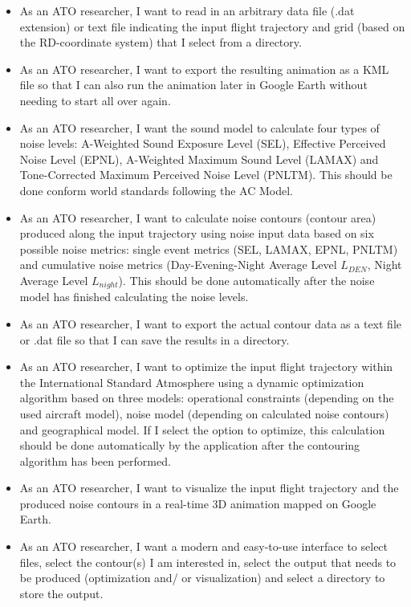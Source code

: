 \begin{itemize}
\item As an ATO researcher, I want to read in an arbitrary data file (.dat extension) or text file indicating the input flight trajectory and grid (based on the RD-coordinate system) that I select from a directory.
\item As an ATO researcher, I want to export the resulting animation as a KML file so that I can also run the animation later in Google Earth without needing to start all over again. 
\item As an ATO researcher, I want the sound model to calculate four types of noise levels: A-Weighted Sound Exposure Level (SEL), Effective Perceived Noise Level (EPNL), A-Weighted Maximum Sound Level (LAMAX) and Tone-Corrected Maximum Perceived Noise Level (PNLTM). This should be done conform world standards following the AC Model.
\item As an ATO researcher, I want to calculate noise contours (contour area) produced along the input trajectory using noise input data based on six possible noise metrics: single event metrics (SEL, LAMAX, EPNL, PNLTM) and cumulative noise metrics (Day-Evening-Night Average Level $L_{DEN}$, Night Average Level $L_{night}$). This should be done automatically after the noise model has finished calculating the noise levels.
\item As an ATO researcher, I want to export the actual contour data as a text file or .dat file so that I can save the results in a directory. 
\item As an ATO researcher, I want to optimize the input flight trajectory within the International Standard Atmosphere using a dynamic optimization algorithm based on three models: operational constraints (depending on the used aircraft model), noise model (depending on calculated noise contours) and geographical model. If I select the option to optimize, this calculation should be done automatically by the application after the contouring algorithm has been performed.
\item As an ATO researcher, I want to visualize the input flight trajectory and the produced noise contours in a real-time 3D animation mapped on Google Earth.
\item As an ATO researcher, I want a modern and easy-to-use interface to select files, select the contour(s) I am interested in, select the output that needs to be produced (optimization and/ or visualization) and select a directory to store the output.
\end{itemize}

